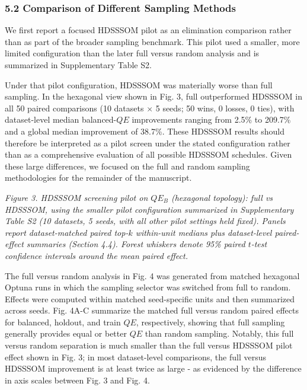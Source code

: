\documentclass[
]{article}
\makeatletter
\newcommand*\pandocbounded[1]{%
  \sbox\pandoc@box{#1}%
  \Gscale@div\@tempa{\textheight}{\dimexpr\ht\pandoc@box+\dp\pandoc@box\relax}%
  \Gscale@div\@tempb{\linewidth}{\wd\pandoc@box}%
  \ifdim\@tempb\p@<\@tempa\p@\let\@tempa\@tempb\fi%
  \ifdim\@tempa\p@<\p@\scalebox{\@tempa}{\usebox\pandoc@box}%
  \else\usebox{\pandoc@box}%
  \fi%
}
\providecommand{\DIFadd}[1]{{\protect\color{blue} #1}} %
\providecommand{\DIFaddbegin}{} %
\providecommand{\DIFaddend}{} %
\makeatother
\begin{document}
\subsubsection{5.2 Comparison of Different Sampling
Methods}\label{comparison-of-different-sampling-methods}

We first report a focused HDSSSOM pilot as an elimination comparison
rather than as part of the broader sampling benchmark. This pilot used a
smaller, more limited configuration than the later full versus random
analysis and is summarized in Supplementary Table S2.

Under that pilot configuration, HDSSSOM was materially worse than full
sampling. In the hexagonal view shown in Fig. 3, full outperformed
HDSSSOM in all 50 paired comparisons (10 datasets \(\times\) 5 seeds; 50
wins, 0 losses, 0 ties), with dataset-level median balanced-\(QE\)
improvements ranging from 2.5\% to 209.7\% and a global median
improvement of 38.7\%. \DIFaddbegin \DIFadd{These HDSSSOM results should therefore be
interpreted as a pilot screen under the stated configuration rather than
as a comprehensive evaluation of all possible HDSSSOM schedules. }\DIFaddend Given
these large differences, we focused on the full and random sampling
methodologies for the remainder of the manuscript.

\pandocbounded{}
\emph{Figure 3. HDSSSOM screening pilot on \(QE_B\) (hexagonal
topology): full vs HDSSSOM, using the smaller pilot configuration
summarized in Supplementary Table S2 (10 datasets, 5 seeds, with all
other pilot settings held fixed). Panels report dataset-matched paired
top-\(k\) within-unit medians plus dataset-level paired-effect summaries
(Section  \DIFaddbegin \DIFadd{4.4}\DIFaddend ). Forest whiskers denote 95\% paired \(t\)-test confidence
intervals around the mean paired effect.}

The full versus random analysis in Fig. 4 was generated from matched
hexagonal Optuna runs in which the sampling selector was switched from
full to random. Effects were computed within matched seed-specific units
and then summarized across seeds. Fig. 4A-C summarize the matched full
versus random paired effects for balanced, holdout, and train \(QE\),
respectively, showing that full sampling generally provides equal or
better \(QE\) than random sampling. Notably, this full versus random
separation is much smaller than the full versus HDSSSOM pilot effect
shown in Fig. 3; in most dataset-level comparisons, the full versus
HDSSSOM improvement is at least twice as large - as evidenced by the
difference in axis scales between Fig. 3 and Fig. 4.
\end{document}
